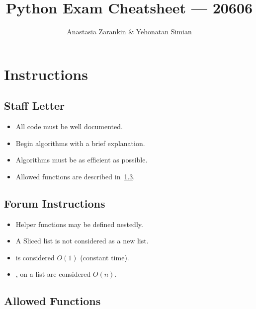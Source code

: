\documentclass[11pt]{article}
\title{Python Exam Cheatsheet --- 20606}
\author{Anastasia Zarankin \& Yehonatan Simian}
\date{}
\begin{document}
\maketitle
\thispagestyle{empty} %

\section{Instructions}
\begin{multicols}{2}
\subsection{Staff Letter}
\begin{itemize}
  \item All code must be well documented.
  \item Begin algorithms with a brief explanation.
  \item Algorithms must be as efficient as possible.
  \item Allowed functions are described in~\ref{sec:allowed-functions}.
\end{itemize}

\subsection{Forum Instructions}
\begin{itemize}
  \item Helper functions may be defined nestedly.
  \item A Sliced list is not considered as a new list.
  \item {} is considered $O(1)$ (constant time).
  \item {},  on a list are considered $O(n)$.
\end{itemize}
\end{multicols}

\subsection{Allowed Functions}\label{sec:allowed-functions}
\end{document}
